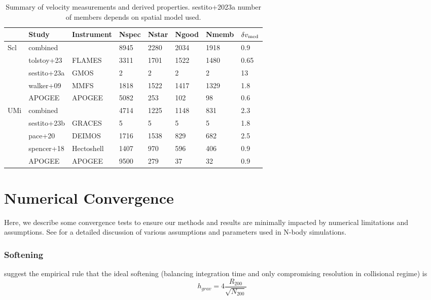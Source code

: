 \begin{table*}[t]
\centering
\caption{Summary of velocity measurements and derived properties. sestito+2023a number of members depends on spatial model used.}
\label{tbl:Summary-of-velocity-measurements-and-derived-properties-sestito+2023a-number-of-members-depends-on-spatial-model-used}
\begin{tabular}{llllllll}
\toprule
 & Study & Instrument & Nspec & Nstar & Ngood & Nmemb & $\delta v_{\rm med}$\\
\midrule
Scl & combined &  & 8945 & 2280 & 2034 & 1918 & 0.9\\
 & tolstoy+23 & FLAMES & 3311 & 1701 & 1522 & 1480 & 0.65\\
 & sestito+23a & GMOS & 2 & 2 & 2 & 2 & 13\\
 & walker+09 & MMFS & 1818 & 1522 & 1417 & 1329 & 1.8\\
 & APOGEE & APOGEE & 5082 & 253 & 102 & 98 & 0.6\\
UMi & combined &  & 4714 & 1225 & 1148 & 831 & 2.3\\
 & sestito+23b & GRACES & 5 & 5 & 5 & 5 & 1.8\\
 & pace+20 & DEIMOS & 1716 & 1538 & 829 & 682 & 2.5\\
 & spencer+18 & Hectoshell & 1407 & 970 & 596 & 406 & 0.9\\
 & APOGEE & APOGEE & 9500 & 279 & 37 & 32 & 0.9\\
\bottomrule
\end{tabular}
\end{table*}

\section{Numerical Convergence}\label{numerical-convergence}

Here, we describe some convergence tests to ensure our methods and
results are minimally impacted by numerical limitations and assumptions.
See \citet{power+2003} for a detailed discussion of various assumptions
and parameters used in N-body simulations.

\subsubsection{Softening}\label{softening}

\citet{power+2003} suggest the empirical rule that the ideal softening
(balancing integration time and only compromising resolution in
collisional regime) is \[
h_{grav} = 4 \frac{R_{200}}{\sqrt{N_{200}}}
\]


